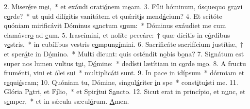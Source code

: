 2. Miser\uline{é}re m\uline{e}i,~* et exáudi orati\uline{ó}nem m\uline{e}am.
3. Fílii hóminum, úsquequo gr\uline{a}vi c\uline{o}rde?~* ut quid dilígitis vanitátem et quǽrit\uline{i}s mend\uline{á}cium?
4. Et scitóte quóniam mirificávit Dóminus s\uline{a}nctum s\uline{u}um:~* Dóminus exáudiet me cum clamáver\uline{o} ad \uline{e}um.
5. Irascímini, et nolíte peccáre:~† quæ dícitis in c\uline{ó}rdibus v\uline{e}stris,~* in cubílibus vestris c\uline{o}mpung\uline{í}mini.
6. Sacrificáte sacrifícium justítiæ,~† et sper\uline{á}te in D\uline{ó}mino.~* Multi dicunt: quis osténdit n\uline{o}bis b\uline{o}na?
7. Signátum est super nos lumen vultus t\uline{u}i, D\uline{ó}mine:~* dedísti lætítiam in c\uline{o}rde m\uline{e}o.
8. A fructu fruménti, vini et \uline{ó}lei s\uline{u}i~* mult\uline{i}plic\uline{á}ti sunt.
9. In pace \uline{i}n id\uline{í}psum~* dórmiam et r\uline{e}qui\uline{é}scam;
10. Quóniam tu, Dómine, singul\uline{á}riter \uline{i}n spe~* const\uline{i}tu\uline{í}sti me.
11. Glória P\uline{a}tri, et F\uline{í}lio,~* et Spir\uline{í}tui S\uline{a}ncto.
12. Sicut erat in princípio, et n\uline{u}nc, et s\uline{e}mper,~* et in sǽcula sæcul\uline{ó}rum. \uline{A}men.

